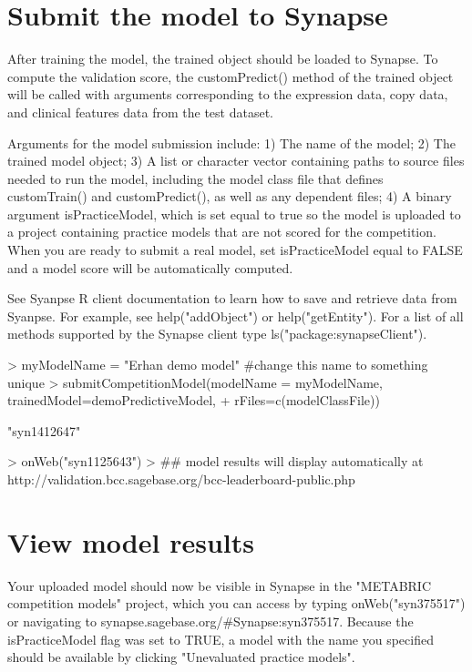 \documentclass[10pt]{article}
\begin{document}
\section{Submit the model to Synapse}
After training the model, the trained object should be loaded to Synapse. To compute the validation score, the customPredict() method of the trained object will be called with arguments corresponding to the expression data, copy data, and clinical features data from the test dataset. 

Arguments for the model submission include: 1) The name of the model; 2) The trained model object; 3) A list or character vector containing paths to source files needed to run the model, including the model class file that defines customTrain() and customPredict(), as well as any dependent files; 4) A binary argument isPracticeModel, which is set equal to true so the model is uploaded to a project containing practice models that are not scored for the competition. When you are ready to submit a real model, set isPracticeModel equal to FALSE and a model score will be automatically computed.

See Syanpse R client documentation to learn how to save and retrieve data from Syanpse. For example, see help("addObject") or help("getEntity"). For a list of all methods supported by the Synapse client type ls("package:synapseClient").

\begin{Schunk}
\begin{Sinput}
> myModelName = "Erhan demo model" #change this name to something unique
> submitCompetitionModel(modelName = myModelName, trainedModel=demoPredictiveModel,
+                        rFiles=c(modelClassFile))
\end{Sinput}
\begin{Soutput}
[1] "syn1412647"
\end{Soutput}
\begin{Sinput}
> onWeb("syn1125643")
> ## model results will display automatically at http://validation.bcc.sagebase.org/bcc-leaderboard-public.php
\end{Sinput}
\end{Schunk}

\section{View model results}
Your uploaded model should now be visible in Synapse in the "METABRIC competition models" project, which you can access by typing onWeb("syn375517") or navigating to synapse.sagebase.org/\#Synapse:syn375517. Because the isPracticeModel flag was set to TRUE, a model with the name you specified should be available by clicking "Unevaluated practice models".
\end{document}

